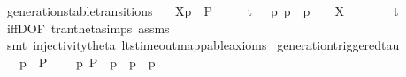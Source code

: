 \begin{isabellebody}
\endisatagproof
{\isafoldproof}%
%
\isadelimproof
\isanewline
%
\endisadelimproof
\isanewline
{}\isamarkupfalse%
\ generation{\isacharunderscore}{\kern0pt}stable{\isacharunderscore}{\kern0pt}transitions{\isacharcolon}{\kern0pt}\isanewline
\ \ \ {\isacartoucheopen}{\isasymtheta}{\isacharbrackleft}{\kern0pt}X{\isacharbrackright}{\kern0pt}{\isacharparenleft}{\kern0pt}p{\isacharparenright}{\kern0pt}\ {\isasymlongmapsto}\isactrlsup {\isasymtheta}{\isasymalpha}\ P{\isacharprime}{\kern0pt}{\isacartoucheclose}\isanewline
\ \ \ {\isacartoucheopen}{\isasymalpha}\ {\isacharequal}{\kern0pt}\ t{\isacharunderscore}{\kern0pt}{\isasymepsilon}\ {\isasymor}\ {\isacharparenleft}{\kern0pt}{\isasymexists}\ p{\isacharprime}{\kern0pt}{\isachardot}{\kern0pt}\ p\ {\isasymlongmapsto}{\isasymalpha}\ p{\isacharprime}{\kern0pt}\ {\isasymand}\ {\isacharparenleft}{\kern0pt}{\isasymalpha}\ {\isasymin}\ X\ {\isasymor}\ {\isasymalpha}\ {\isacharequal}{\kern0pt}\ {\isasymtau}\ {\isasymor}\ {\isasymalpha}\ {\isacharequal}{\kern0pt}\ t{\isacharparenright}{\kern0pt}{\isacharparenright}{\kern0pt}{\isacartoucheclose}\isanewline
%
\isadelimproof
\ \ %
\endisadelimproof
%
\isatagproof
{}\isamarkupfalse%
\ iffD{}{\isacharbrackleft}{\kern0pt}OF\ tran{\isacharunderscore}{\kern0pt}theta{\isachardot}{\kern0pt}simps\ assms{\isacharbrackright}{\kern0pt}\isanewline
\ \ \isamarkupfalse%
\ {\isacharparenleft}{\kern0pt}smt\ injectivity{\isacharunderscore}{\kern0pt}theta{\isacharparenleft}{\kern0pt}{}{\isacharcomma}{\kern0pt}{}{\isacharparenright}{\kern0pt}\ lts{\isacharunderscore}{\kern0pt}timeout{\isacharunderscore}{\kern0pt}mappable{\isacharunderscore}{\kern0pt}axioms{\isacharparenright}{\kern0pt}%
\endisatagproof
{\isafoldproof}%
%
\isadelimproof
\isanewline
%
\endisadelimproof
\isanewline
{}\isamarkupfalse%
\ generation{\isacharunderscore}{\kern0pt}triggered{\isacharunderscore}{\kern0pt}tau{\isacharcolon}{\kern0pt}\isanewline
\ \ \ {\isacartoucheopen}{\isasymtheta}{\isacharparenleft}{\kern0pt}p{\isacharparenright}{\kern0pt}\ {\isasymlongmapsto}\isactrlsup {\isasymtheta}{\isasymtau}\ P{\isacharprime}{\kern0pt}{\isacartoucheclose}\isanewline
\ \ \ {\isacartoucheopen}{\isasymexists}\ p{\isacharprime}{\kern0pt}{\isachardot}{\kern0pt}\ P{\isacharprime}{\kern0pt}\ {\isacharequal}{\kern0pt}\ {\isasymtheta}{\isacharparenleft}{\kern0pt}p{\isacharprime}{\kern0pt}{\isacharparenright}{\kern0pt}\ {\isasymand}\ p\ {\isasymlongmapsto}{\isasymtau}\ p{\isacharprime}{\kern0pt}{\isacartoucheclose}\isanewline

\end{isabellebody}
